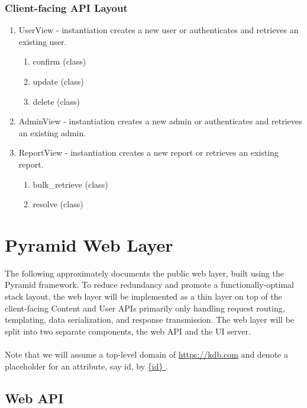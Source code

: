 \documentclass[12pt,letterpaper]{article}
\begin{document}
\subsubsection{Client-facing API Layout}

\begin{enumerate}
\item[] UserView - instantiation creates a new user or authenticates and retrieves an existing user. 
\begin{enumerate}
\item[] confirm (class)
\item[] update (class)
\item[] delete (class)
\end{enumerate}
\item[] AdminView - instantiation creates a new admin or authenticates and retrieves an existing admin.
\item[] ReportView - instantiation creates a new report or retrieves an existing report. 
\begin{enumerate}
\item[] bulk\_retrieve (class)
\item[] resolve (class)
\end{enumerate}
\end{enumerate}




\section{Pyramid Web Layer}

The following approximately documents the public web layer, built using the Pyramid framework. To reduce redundancy and promote a functionally-optimal stack layout, the web layer will be implemented as a thin layer on top of the client-facing Content and User APIs primarily only handling request routing, templating, data serialization, and response transmission. The web layer will be split into two separate components, the web API and the UI server. 
\\
\\
Note that we will assume a top-level domain of \url{https://kdb.com} and denote a placeholder for an attribute, say id, by \url{ {id} }.

\subsection{Web API}
\end{document}
